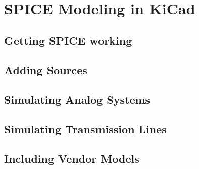 \chapter{SPICE Modeling in KiCad}
\label{ch:spice}

\section{Getting SPICE working}
\section{Adding Sources}
\section{Simulating Analog Systems}
\section{Simulating Transmission Lines}
\section{Including Vendor Models}